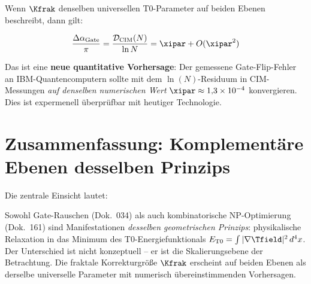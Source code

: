 Wenn $\Kfrak$ denselben universellen T0-Parameter auf beiden Ebenen beschreibt, dann
gilt:

\begin{equation}
    \frac{\Delta\alpha_{\text{Gate}}}{\pi} = \frac{\mathcal{D}_{\text{CIM}}(N)}{\ln N}
    = \xipar + O(\xipar^2)
    \label{eq:universal_kfrak}
\end{equation}

Das ist eine \textbf{neue quantitative Vorhersage}: Der gemessene Gate-Flip-Fehler an
IBM-Quantencomputern sollte mit dem $\ln(N)$-Residuum in CIM-Messungen
\emph{auf denselben numerischen Wert} $\xipar \approx 1{,}3 \times 10^{-4}$ konvergieren.
Dies ist expermenell überprüfbar mit heutiger Technologie.

\clearpage

\section{Zusammenfassung: Komplementäre Ebenen desselben Prinzips}
\label{sec:summary}

\begin{table}[h]
    \centering
    \caption{Vollständige Synthese: Beide Dokumente als komplementäre T0-Ebenen}
    \label{tab:synthesis}
\end{table}

Die zentrale Einsicht lautet:

\begin{revolutionary}
    Sowohl Gate-Rauschen (Dok.\ 034) als auch kombinatorische NP-Optimierung
    (Dok.\ 161) sind Manifestationen \emph{desselben geometrischen Prinzips}:
    physikalische Relaxation in das Minimum des T0-Energiefunktionals
    $E_{\text{T0}} = \int |\nabla \Tfield|^2 \, d^4x$.
    Der Unterschied ist nicht konzeptuell -- er ist die Skalierungsebene der
    Betrachtung. Die fraktale Korrekturgröße $\Kfrak$ erscheint auf beiden Ebenen
    als derselbe universelle Parameter mit numerisch übereinstimmenden Vorhersagen.
\end{revolutionary}

